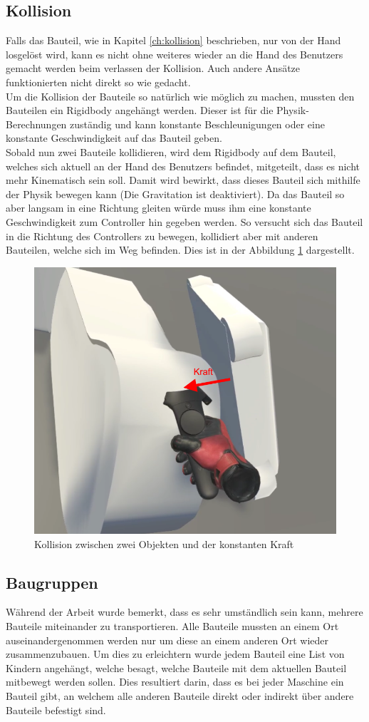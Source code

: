 \subsection{Kollision}
\label{ch:kollision_single_user}
Falls das Bauteil, wie in Kapitel \ref{ch:kollision} beschrieben, nur von der Hand losgelöst wird, kann es nicht ohne weiteres wieder an die Hand des Benutzers gemacht werden beim verlassen der Kollision. Auch andere Ansätze funktionierten nicht direkt so wie gedacht. \\

\noindent Um die Kollision der Bauteile so natürlich wie möglich zu machen, mussten den Bauteilen ein Rigidbody angehängt werden. Dieser ist für die Physik-Berechnungen zuständig und kann konstante Beschleunigungen oder eine konstante Geschwindigkeit auf das Bauteil geben. \\
Sobald nun zwei Bauteile kollidieren, wird dem Rigidbody auf dem Bauteil, welches sich aktuell an der Hand des Benutzers befindet, mitgeteilt, dass es nicht mehr Kinematisch sein soll. Damit wird bewirkt, dass dieses Bauteil sich mithilfe der Physik bewegen kann (Die Gravitation ist deaktiviert). Da das Bauteil so aber langsam in eine Richtung gleiten würde muss ihm eine konstante Geschwindigkeit zum Controller hin gegeben werden. So versucht sich das Bauteil in die Richtung des Controllers zu bewegen, kollidiert aber mit anderen Bauteilen, welche sich im Weg befinden. Dies ist in der Abbildung \ref{fig:collision} dargestellt.

\begin{figure}[h!]
	\centering
	\includegraphics[keepaspectratio,width=0.4\linewidth]{img/Kollision.PNG}
	\caption{Kollision zwischen zwei Objekten und der konstanten Kraft}
	\label{fig:collision}
\end{figure}

\subsection{Baugruppen}
\label{ch:baugruppen}
Während der Arbeit wurde bemerkt, dass es sehr umständlich sein kann, mehrere Bauteile miteinander zu transportieren. Alle Bauteile mussten an einem Ort auseinandergenommen werden nur um diese an einem anderen Ort wieder zusammenzubauen. Um dies zu erleichtern wurde jedem Bauteil eine List von Kindern angehängt, welche besagt, welche Bauteile mit dem aktuellen Bauteil mitbewegt werden sollen. Dies resultiert darin, dass es bei jeder Maschine ein Bauteil gibt, an welchem alle anderen Bauteile direkt oder indirekt über andere Bauteile befestigt sind. \\

